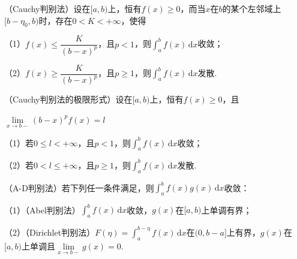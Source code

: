 \documentclass{ctexbook}
\begin{document}
	\hspace*{\fill}
	
	（Cauchy判别法）设在$[a,b)$上，恒有$f(x)\ge0$，而当$x$在$b$的某个左邻域上$[b-\eta_0,b)$时，存在$0<K<+\infty$，使得
	
	（1）$f(x)\le \dfrac{K}{(b-x)^p}$，且$p<1$，则$\displaystyle\int_{a}^{b}f(x)\,\mathrm{d} x$收敛；
	
	（2）$f(x)\ge \dfrac{K}{(b-x)^p}$，且$p\ge1$，则$\displaystyle\int_{a}^{b}f(x)\,\mathrm{d} x$发散.
	
	\hspace*{\fill}
	
	（Cauchy判别法的极限形式）设在$[a,b)$上，恒有$f(x)\ge0$，且
	
	\centerline{$\lim\limits_{x\rightarrow b-}(b-x)^p f(x)=l$}
	
	（1）若$0\le l<+\infty$，且$p<1$，则$\displaystyle\int_{a}^{b}f(x)\,\mathrm{d} x$收敛；
	
	（2）若$0< l\le +\infty$，且$p\ge1$，则$\displaystyle\int_{a}^{b}f(x)\,\mathrm{d} x$发散.
	
	\hspace*{\fill}
	
	（A-D判别法）若下列任一条件满足，则$\displaystyle\int_{a}^{b}f(x)g(x)\,\mathrm{d} x$收敛：
	
	（1）（Abel判别法）$\displaystyle\int_{a}^{b}f(x)\,\mathrm{d} x$收敛，$g(x)$在$[a,b)$上单调有界；
	
	（2）（Dirichlet判别法）$F(\eta)=\displaystyle\int_{a}^{b-\eta}f(x)\,\mathrm{d} x$在$(0,b-a]$上有界，$g(x)$在$[a,b)$上单调且$\lim\limits_{x\rightarrow b-}g(x)=0$.
\end{document}
